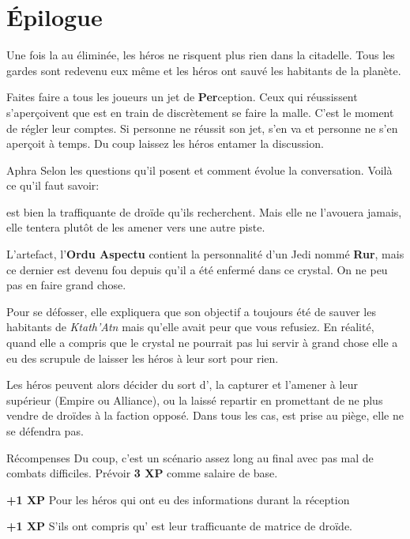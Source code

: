 \section{\'Epilogue}

Une fois la  au éliminée, les héros ne risquent plus rien dans la citadelle. Tous les gardes sont redevenu eux même et les héros ont sauvé les habitants de la planète.

Faites faire a tous les joueurs un jet de \textbf{Per}ception. Ceux qui réussissent s’aperçoivent que  est en train de discrètement se faire la malle. C’est le moment de régler leur comptes. Si personne ne réussit son jet,  s’en va et personne ne s’en aperçoit à temps.
Du coup laissez les héros entamer la discussion. 

\begin{paperbox}{Aphra}
Selon les questions qu’il posent et comment évolue la conversation. Voilà ce qu’il faut savoir:

\begin{rebelist}
    \item {} est bien la traffiquante de droïde qu’ils recherchent. Mais elle ne l’avouera jamais, elle tentera plutôt de les amener vers une autre piste.
    \item L’artefact, l’\textbf{Ordu Aspectu} contient la personnalité d’un Jedi nommé \textbf{Rur}, mais ce dernier est devenu fou depuis qu’il a été enfermé dans ce crystal. On ne peu pas en faire grand chose.
    \item Pour se défosser, elle expliquera que son objectif a toujours été de sauver les habitants de \textit{Ktath'Atn} mais qu’elle avait peur que vous refusiez. En réalité, quand elle a compris que le crystal ne pourrait pas lui servir à grand chose elle a eu des scrupule de laisser les héros à leur sort pour rien.
\end{rebelist}
\end{paperbox}

Les héros peuvent alors décider du sort d’, la capturer et l’amener à leur supérieur (Empire ou Alliance), ou la laissé repartir en promettant de ne plus vendre de droïdes à la faction opposé. Dans tous les cas,  est prise au piège, elle ne se défendra pas.

\begin{paperbox}{Récompenses}
Du coup, c’est un scénario assez long au final avec pas mal de combats difficiles. Prévoir \textbf{3 XP} comme salaire de base.
\begin{rebelist}
    \item \textbf{+1 XP} Pour les héros qui ont eu des informations durant la réception
    \item \textbf{+1 XP} S’ils ont compris qu’ est leur trafficuante de matrice de droïde.
\end{rebelist}
\end{paperbox}